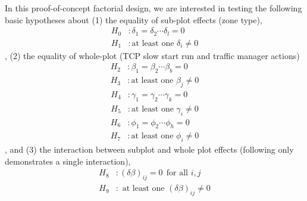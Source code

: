 \documentclass{article}
\begin{document}
In this proof-of-concept factorial design, we are interested in testing the following basic hypotheses about (1) the equality of sub-plot effects (zone type), 
\begin{equation} \label{eq2}
\begin{split}
    H_0 & : \delta_1 = \delta_2 \cdots \delta_l = 0 \\
    H_1 & : \text{at least one } \delta_i \neq 0
\end{split}
\end{equation}
, (2) the equality of whole-plot (TCP slow start run and traffic manager actions)
\begin{equation} \label{eq3}
\begin{split}
    H_2 & : \beta_1 = \beta_2 \cdots \beta_b = 0 \\
    H_3 & : \text{at least one } \beta_j \neq 0
\end{split}
\end{equation}
\begin{equation} \label{eq4}
\begin{split}
    H_4 & : \gamma_1 = \gamma_2 \cdots \gamma_k = 0 \\
    H_5 & : \text{at least one } \gamma_i \neq 0
\end{split}
\end{equation}
\begin{equation} \label{eq5}
\begin{split}
    H_6 & : \phi_1 = \phi_2 \cdots \phi_h = 0 \\
    H_7 & : \text{at least one } \phi_i \neq 0
\end{split}
\end{equation}
, and (3) the interaction between subplot and whole plot effects (following only demonstrates a single interaction), 
\begin{equation} \label{eq6}
\begin{split}
    H_8 & : (\delta\beta)_{ij} = 0 \ \ \text{for all } i, j \\
    H_9 & : \text{ at least one } (\delta\beta)_{ij} \neq 0
\end{split}
\end{equation}

\end{document}
